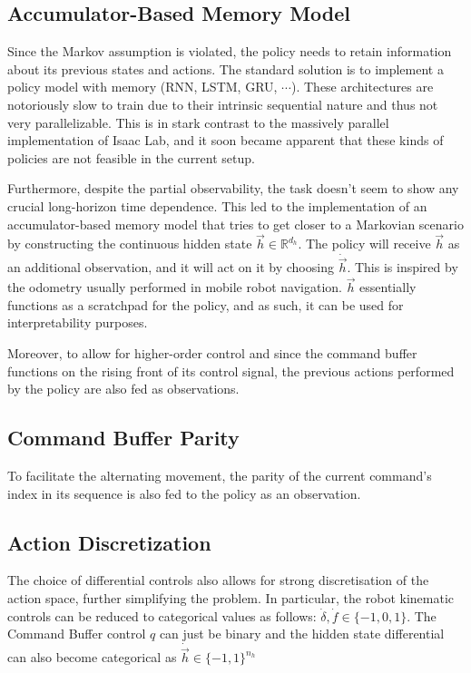 \documentclass[11pt,a4paper,twocolumn]{article}
\begin{document}
\subsection{Accumulator-Based Memory Model}
Since the Markov assumption is violated, the policy needs to retain information about its previous states and actions. The standard solution is to implement a policy model with memory (RNN, LSTM, GRU, $\cdots$). These architectures are notoriously slow to train due to their intrinsic sequential nature and thus not very parallelizable. This is in stark contrast to the massively parallel implementation of Isaac Lab, and it soon became apparent that these kinds of policies are not feasible in the current setup.

Furthermore, despite the partial observability, the task doesn't seem to show any crucial long-horizon time dependence. This led to the implementation of an accumulator-based memory model that tries to get closer to a Markovian scenario by constructing the continuous hidden state $\vec{h}\in\mathbb{R}^{d_h}$. The policy will receive $\vec{h}$ as an additional observation, and it will act on it by choosing $\dot{\vec{h}}$. This is inspired by the odometry usually performed in mobile robot navigation. $\vec{h}$ essentially functions as a scratchpad for the policy, and as such, it can be used for interpretability purposes.

Moreover, to allow for higher-order control and since the command buffer functions on the rising front of its control signal, the previous actions performed by the policy are also fed as observations.

\subsection{Command Buffer Parity}
To facilitate the alternating movement, the parity of the current command's index in its sequence is also fed to the policy as an observation.

\subsection{Action Discretization}
The choice of differential controls also allows for strong discretisation of the action space, further simplifying the problem. In particular, the robot kinematic controls can be reduced to categorical values as follows: $\dot{\delta}, \dot{f} \in \{-1, 0, 1\}$. The Command Buffer control $q$ can just be binary and the hidden state differential can also become categorical as $\dot{\vec{h}}\in \{-1, 1\}^{n_h}$ 
\end{document}
